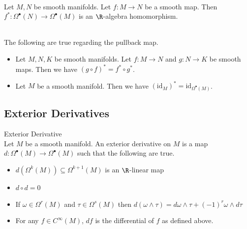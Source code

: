 \documentclass[a4paper]{article}
\begin{document}
\begin{prp}{}{}\\
Let $M,N$ be smooth manifolds. Let $f:M\to N$ be a smooth map. Then $f^\ast:\Omega^\bullet(N)\to\Omega^\bullet(M)$ is an $\R$-algebra homomorphism. 
\end{prp}

\begin{prp}{}{}\\
The following are true regarding the pullback map. 
\begin{itemize}
\item Let $M,N,K$ be smooth manifolds. Let $f:M\to N$ and $g:N\to K$ be smooth maps. Then we have $(g\circ f)^\ast=f^\ast\circ g^\ast$. 
\item Let $M$ be a smooth manifold. Then we have $(\text{id}_M)^\ast=\text{id}_{\Omega^\bullet(M)}$. 
\end{itemize}
\end{prp}

\subsection{Exterior Derivatives}
\begin{defn}{Exterior Derivative}{}\\
Let $M$ be a smooth manifold. An exterior derivative on $M$ is a map $d:\Omega^\bullet(M)\to\Omega^\bullet(M)$ such that the following are true. 
\begin{itemize}
\item $d(\Omega^k(M))\subseteq\Omega^{k+1}(M)$ is an $\R$-linear map
\item $d\circ d=0$
\item If $\omega\in\Omega^r(M)$ and $\tau\in\Omega^s(M)$ then $d(\omega\wedge\tau)=d\omega\wedge\tau+(-1)^r\omega\wedge d\tau$
\item For any $f\in C^\infty(M)$, $df$ is the differential of $f$ as defined above. 
\end{itemize}
\end{defn}
\end{document}
